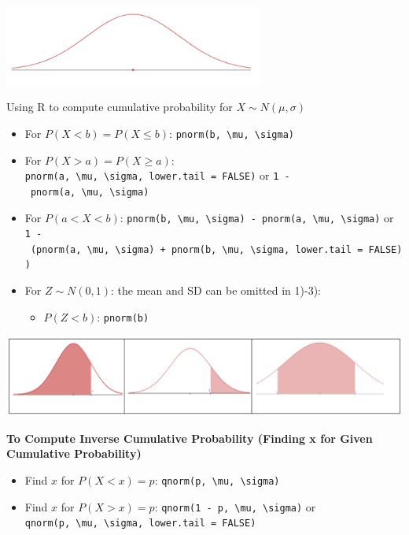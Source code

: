 \documentclass[
]{book}
\providecommand{\tightlist}{%
  \setlength{\itemsep}{0pt}\setlength{\parskip}{0pt}}
\begin{document}
\includegraphics[width=3.36458in,height=\textheight]{images/img44.png}

Using R to compute cumulative probability for \(X \sim N(\mu, \sigma)\)

\begin{itemize}
\tightlist
\item
  For \(P(X < b) = P(X \leq b)\): \texttt{pnorm(b,\ \textbackslash{}mu,\ \textbackslash{}sigma)}
\item
  For \(P(X > a) = P(X \geq a)\): \texttt{pnorm(a,\ \textbackslash{}mu,\ \textbackslash{}sigma,\ lower.tail\ =\ FALSE)} or \texttt{1\ -\ pnorm(a,\ \textbackslash{}mu,\ \textbackslash{}sigma)}
\item
  For \(P(a < X < b)\): \texttt{pnorm(b,\ \textbackslash{}mu,\ \textbackslash{}sigma)\ -\ pnorm(a,\ \textbackslash{}mu,\ \textbackslash{}sigma)} or \texttt{1\ -\ (pnorm(a,\ \textbackslash{}mu,\ \textbackslash{}sigma)\ +\ pnorm(b,\ \textbackslash{}mu,\ \textbackslash{}sigma,\ lower.tail\ =\ FALSE))}
\item
  For \(Z \sim N(0, 1)\): the mean and SD can be omitted in 1)-3):

  \begin{itemize}
  \tightlist
  \item
    \(P(Z < b)\): \texttt{pnorm(b)}
  \end{itemize}
\end{itemize}

\includegraphics[width=5.72917in,height=\textheight]{images/img45.png}

\textbf{To Compute Inverse Cumulative Probability (Finding x for Given Cumulative Probability)}

\begin{itemize}
\tightlist
\item
  Find \(x\) for \(P(X < x) = p\): \texttt{qnorm(p,\ \textbackslash{}mu,\ \textbackslash{}sigma)}
\item
  Find \(x\) for \(P(X > x) = p\): \texttt{qnorm(1\ -\ p,\ \textbackslash{}mu,\ \textbackslash{}sigma)} or \texttt{qnorm(p,\ \textbackslash{}mu,\ \textbackslash{}sigma,\ lower.tail\ =\ FALSE)}
\end{itemize}
\end{document}
